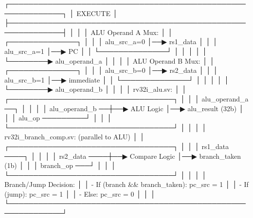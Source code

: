 \begin{record}

\begin{textblock}
┌─────────────────────────────────────────────────────────────┐
│                      EXECUTE                                │
├─────────────────────────────────────────────────────────────┤
│                                                             │
│  ALU Operand A Mux:                                         │
│  ┌──────────────┐                                           │
│  │ alu_src_a=0  │──▶ rs1_data                               │
│  │ alu_src_a=1  │──▶ PC                                     │
│  └──────────────┘                                           │
│         │                                                   │
│         └────────▶ alu_operand_a                            │
│                                                             │
│  ALU Operand B Mux:                                         │
│  ┌──────────────┐                                           │
│  │ alu_src_b=0  │──▶ rs2_data                               │
│  │ alu_src_b=1  │──▶ immediate                              │
│  └──────────────┘                                           │
│         │                                                   │
│         └────────▶ alu_operand_b                            │
│                                                             │
│  rv32i_alu.sv:                                              │
│  ┌──────────────────────────────────┐                       │
│  │ alu_operand_a ──┐                │                       │
│  │ alu_operand_b ──┼──▶ ALU Logic   │──▶ alu_result (32b)  │
│  │ alu_op ─────────┘                │                       │
│  └──────────────────────────────────┘                       │
│                                                             │
│  rv32i_branch_comp.sv: (parallel to ALU)                    │
│  ┌──────────────────────────────────┐                       │
│  │ rs1_data ────┐                   │                       │
│  │ rs2_data ────┼──▶ Compare Logic  │──▶ branch_taken (1b) │
│  │ branch_op ───┘                   │                       │
│  └──────────────────────────────────┘                       │
│                                                             │
│  Branch/Jump Decision:                                      │
│  - If (branch && branch_taken): pc_src = 1                  │
│  - If (jump): pc_src = 1                                    │
│  - Else: pc_src = 0                                         │
│                                                             │
└─────────────────────────────────────────────────────────────┘
\end{textblock}

\end{record}

